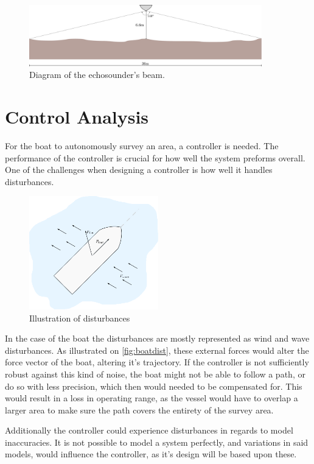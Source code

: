 \begin{figure}[H]
    \includegraphics[width=0.9\textwidth]{figures/echosounder}
    \caption{Diagram of the echosounder's beam.}
    \label{fig:echosounder}
\end{figure}

\section{Control Analysis}
For the boat to autonomously survey an area, a controller is needed. 
The performance of the controller is crucial for how well the system preforms overall. 
One of the challenges when designing a controller is how well it handles disturbances. 
\begin{figure}[H]
    \includegraphics[width=0.5\textwidth]{figures/boatdisturbance}
    \caption{Illustration of disturbances}
    \label{fig:boatdist}
\end{figure}
In the case of the boat the disturbances are mostly represented as wind and wave disturbances. 
As illustrated on \autoref{fig:boatdist}, these external forces would alter the force vector of the boat, altering it's trajectory. 
If the controller is not sufficiently robust against this kind of noise, the boat might not be able to follow a path, or do so with less precision, which then would needed to be compensated for. 
This would result in a loss in operating range, as the vessel would have to overlap a larger area to make sure the path covers the entirety of the survey area.

Additionally the controller could experience disturbances in regards to model inaccuracies. 
It is not possible to model a system perfectly, and variations in said models, would influence the controller, as it's design will be based upon these. 

